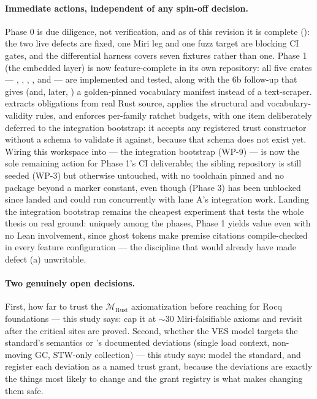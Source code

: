 \paragraph{Immediate actions, independent of any spin-off decision.}
Phase 0 is due diligence, not verification, and as of this revision it
is complete (): the two live defects are fixed, one
Miri leg and one fuzz target are blocking CI gates, and the
differential harness covers seven fixtures rather than one. Phase 1
(the embedded layer) is now feature-complete in its own repository:
all five  crates --- ,
, , , and
 --- are implemented and tested, along with the 6b
follow-up that gives  (and, later, ) a
golden-pinned vocabulary manifest instead of a text-scraper.
 extracts obligations from real Rust source, applies
the structural and vocabulary-validity rules, and enforces per-family
ratchet budgets, with one item deliberately deferred to the
integration bootstrap: it accepts any registered trust constructor
without a  schema to validate it against, because
that schema does not exist yet. Wiring this workspace into
\dotnetrs{} --- the integration bootstrap (WP-9) --- is now the sole
remaining action for Phase 1's CI deliverable; the sibling
 repository is still seeded (WP-3) but otherwise
untouched, with no toolchain pinned and no package beyond a marker
constant, even though  (Phase 3) has been unblocked
since  landed and could run concurrently with
lane A's integration work. Landing the integration bootstrap remains
the cheapest experiment that tests the whole
thesis on real ground: uniquely among the phases, Phase 1 yields value
even with no Lean involvement, since ghost tokens make premise
citations compile-checked in every feature configuration --- the
discipline that would already have made defect (a) unwritable.

\paragraph{Two genuinely open decisions.} First, how far to trust
the $\mathcal{M}_{\mathrm{Rust}}$ axiomatization before reaching for
Rocq foundations --- this study says: cap it at $\sim$30
Miri-falsifiable axioms and revisit after the critical sites are proved.
Second, whether the VES model targets the standard's semantics or
\dotnetrs{}'s documented deviations (single load context, non-moving
GC, STW-only collection) --- this study says: model the standard, and
register each deviation as a named trust grant, because the deviations
are exactly the things most likely to change and the grant registry is
what makes changing them safe.


